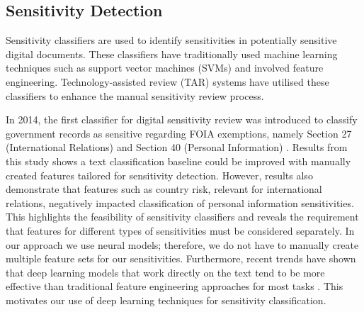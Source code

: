\label{sec:background}
\subsection{Sensitivity Detection}
\label{sec:background:sensitivity_detection}
Sensitivity classifiers are used to identify sensitivities in potentially sensitive digital documents. These classifiers have traditionally used machine learning techniques such as support vector machines (SVMs) and involved feature engineering. Technology-assisted review (TAR) systems have utilised these classifiers to enhance the manual sensitivity review process.

In 2014, the first classifier for digital sensitivity review was introduced to classify government records as sensitive regarding FOIA exemptions, namely Section 27 (International Relations) and Section 40 (Personal Information) \cite{mcdonald2014towards}. Results from this study shows a text classification baseline could be improved with manually created features tailored for sensitivity detection. However, results also demonstrate that features such as country risk, relevant for international relations, negatively impacted classification of personal information sensitivities. This highlights the feasibility of sensitivity classifiers and reveals the requirement that features for different types of sensitivities must be considered separately. In our approach we use neural models; therefore, we do not have to manually create multiple feature sets for our sensitivities. Furthermore, recent trends have shown that deep learning models that work directly on the text tend to be more effective than traditional feature engineering approaches for most tasks \cite{otter2020survey}. This motivates our use of deep learning techniques for sensitivity classification.

